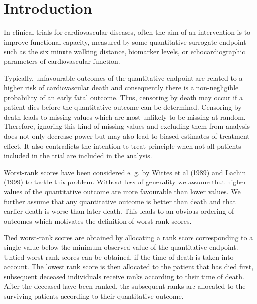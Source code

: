 \documentclass[bimj,fleqn]{w-art}\usepackage[]{graphicx}\usepackage[]{color}
\theoremstyle{plain}
\theoremstyle{definition}
\providecommand{\DIFdelend}{} %
\DeclareRobustCommand{\DIFdelend}{\DIFOaddend \let\includegraphics\DIFOincludegraphics} %
\begin{document}



\DIFdelend \section{Introduction}
\label{sec:Intro}

In clinical trials for cardiovascular diseases, often the aim of an
intervention is to improve functional capacity, measured by some quantitative
surrogate endpoint such as the six minute walking distance, biomarker levels,
or echocardiographic parameters of cardiovascular function.

Typically, unfavourable outcomes of the quantitative endpoint are related to a
higher risk of cardiovascular death and consequently there is a non-negligible
probability of an early fatal outcome. Thus, censoring by
death may occur if a patient dies before the quantitative outcome can be
determined. Censoring by death leads to missing values which are most unlikely
to be missing at random. Therefore, ignoring this kind of missing values and
excluding them from analysis does not only decrease power but may also lead to
biased estimates of treatment effect. It also contradicts the
intention-to-treat principle when not all patients included in the trial are
included in the analysis.

Worst-rank scores have been considered e. g. by Wittes et al (1989) and Lachin
(1999) to tackle this problem. Without loss of generality we assume that
higher values of the quantitative outcome are more favourable than lower
values. We further assume that any quantitative outcome is better than death
and that earlier death is worse than later death. This leads to an obvious
ordering of outcomes which motivates the definition of worst-rank scores.

Tied worst-rank scores are obtained by allocating a rank score corresponding
to a single value below the minimum observed value of the quantitative
endpoint. Untied worst-rank scores can be obtained, if the time of death is
taken into account. The lowest rank score is then allocated to the patient
that has died first, subsequent deceased individuals receive ranks according
to their time of death. After the deceased have been ranked, the subsequent
ranks are allocated to the surviving patients according to their quantitative
outcome.
\end{document}
